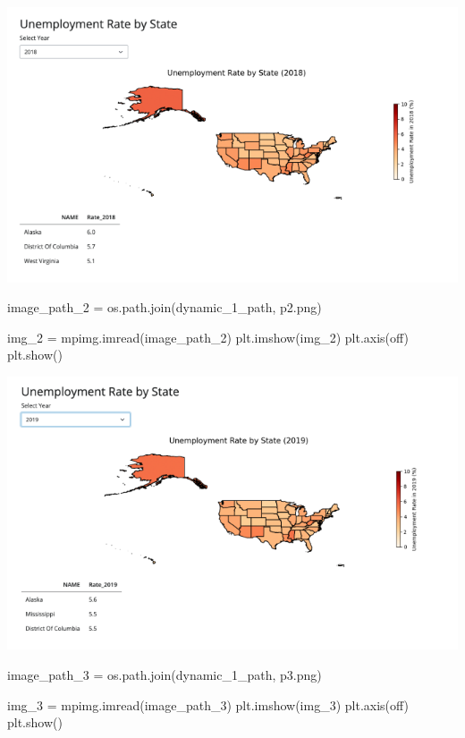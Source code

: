 \documentclass[
  letterpaper,
  DIV=11,
  numbers=noendperiod]{scrartcl}
\newenvironment{Shaded}{\begin{snugshade}}{\end{snugshade}}
\newcommand{\NormalTok}[1]{\textcolor[rgb]{0.00,0.23,0.31}{#1}}
\newcommand{\OperatorTok}[1]{\textcolor[rgb]{0.37,0.37,0.37}{#1}}
\newcommand{\StringTok}[1]{\textcolor[rgb]{0.13,0.47,0.30}{#1}}
\begin{document}
\includegraphics{finalproject_template_files/figure-pdf/cell-12-output-1.pdf}

\begin{Shaded}
\begin{Highlighting}[]
\NormalTok{image\_path\_2 }\OperatorTok{=}\NormalTok{ os.path.join(dynamic\_1\_path, }\StringTok{\textquotesingle{}p2.png\textquotesingle{}}\NormalTok{)}

\NormalTok{img\_2 }\OperatorTok{=}\NormalTok{ mpimg.imread(image\_path\_2)}
\NormalTok{plt.imshow(img\_2)}
\NormalTok{plt.axis(}\StringTok{\textquotesingle{}off\textquotesingle{}}\NormalTok{)}
\NormalTok{plt.show()}
\end{Highlighting}
\end{Shaded}

\includegraphics{finalproject_template_files/figure-pdf/cell-13-output-1.pdf}

\begin{Shaded}
\begin{Highlighting}[]
\NormalTok{image\_path\_3 }\OperatorTok{=}\NormalTok{ os.path.join(dynamic\_1\_path, }\StringTok{\textquotesingle{}p3.png\textquotesingle{}}\NormalTok{)}

\NormalTok{img\_3 }\OperatorTok{=}\NormalTok{ mpimg.imread(image\_path\_3)}
\NormalTok{plt.imshow(img\_3)}
\NormalTok{plt.axis(}\StringTok{\textquotesingle{}off\textquotesingle{}}\NormalTok{)}
\NormalTok{plt.show()}
\end{Highlighting}
\end{Shaded}
\end{document}
